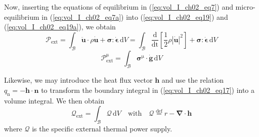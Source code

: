Now, inserting the equations of equilibrium in (\ref{eq:vol_I_ch02_eq7}) and micro-equilibrium in (\ref{eq:vol_I_ch02_eq7a})
into (\ref{eq:vol_I_ch02_eq19}) and (\ref{eq:vol_I_ch02_eq19a}), we obtain
\begin{equation}
  {\mathcal{P}}_{\mathrm{ext}} = \int_{\mathcal B} {\ddot{\bm u}} \cdot{\rho}\dot{\bm u} + {\bm \sigma} : \dot{\bm \epsilon}\,{\mathrm{d}}V =
  \int_{\mathcal B} \frac{\mathrm{d}}{\mathrm{dt}}\left[\frac{1}{2}\rho|\dot{\bm u}|^2\right] + {\bm \sigma} : \dot{\bm \epsilon}\,{\mathrm{d}}V
\label{eq:vol_I_ch02_eq21}
\end{equation}
\begin{equation}
  {\mathcal{P}}_{\mathrm{ext}}^{\mathrm{\mu}} = \int_{\mathcal B} \bm{\sigma}^{\mathrm{\mu}} \cdot \dot{\bm g}\,{\mathrm{d}}V
\label{eq:vol_I_ch02_eq21a}
\end{equation}

Likewise, we may introduce the heat flux vector $\bm h$ and use the
relation $q_{\mathrm{n}} = -{\bm h}\cdot{\bm n}$ to transform the
boundary integral in (\ref{eq:vol_I_ch02_eq17}) into a volume
integral. We then obtain
\begin{equation}
  {\mathcal Q}_{\mathrm{ext}} = \int_{\mathcal B} {\mathcal Q}\,{\mathrm{d}}V  \quad
  {\mathrm{with}}
  \quad {\mathcal Q} \stackrel{\mathrm{def}}{=} r - {\bm \nabla}\cdot{\bm h}
       \label{eq:vol_I_ch02_eq22}
\end{equation}
where ${\mathcal Q}$  is the specific external thermal power supply.

